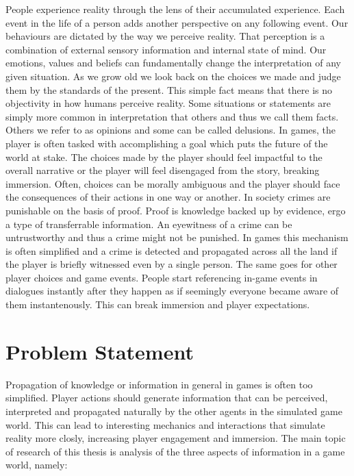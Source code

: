 \label{chapter:introduction}
People experience reality through the lens of their accumulated experience.
Each event in the life of a person adds another perspective on any following event.
Our behaviours are dictated by the way we perceive reality.
That perception is a combination of external sensory information and internal state of mind.
Our emotions, values and beliefs can fundamentally change the interpretation of any given situation.
As we grow old we look back on the choices we made and judge them by the standards of the present.
This simple fact means that there is no objectivity in how humans perceive reality.
Some situations or statements are simply more common in interpretation that others and thus we call them facts.
Others we refer to as opinions and some can be called delusions.
In games, the player is often tasked with accomplishing a goal which puts the future of the world at stake.
The choices made by the player should feel impactful to the overall narrative or the player will feel disengaged from the story, breaking immersion.
Often, choices can be morally ambiguous and the player should face the consequences of their actions in one way or another.
In society crimes are punishable on the basis of proof.
Proof is knowledge backed up by evidence, ergo a type of transferrable information.
An eyewitness of a crime can be untrustworthy and thus a crime might not be punished.
In games this mechanism is often simplified and a crime is detected and propagated across all the land if the player is briefly witnessed even by a single person.
The same goes for other player choices and game events.
People start referencing in-game events in dialogues instantly after they happen as if seemingly everyone became aware of them instantenously.
This can break immersion and player expectations.

\section{Problem Statement}
Propagation of knowledge or information in general in games is often too simplified.
Player actions should generate information that can be perceived, interpreted and propagated naturally by the other agents in the simulated game world.
This can lead to interesting mechanics and interactions that simulate reality more closly, increasing player engagement and immersion.
The main topic of research of this thesis is analysis of the three aspects of information in a game world, namely:

